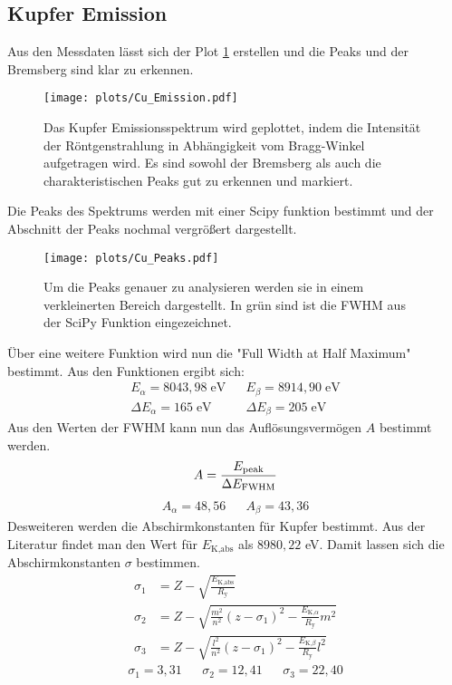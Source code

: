 \subsection{Kupfer Emission}
Aus den Messdaten lässt sich der Plot \ref{fig:Cu_Emission} erstellen und die Peaks und der Bremsberg sind klar zu erkennen.
\begin{figure}
    \centering
    \texttt{[image: plots/Cu\_Emission.pdf]}
    \caption{Das Kupfer Emissionsspektrum wird geplottet, indem die Intensität der Röntgenstrahlung in Abhängigkeit vom Bragg-Winkel aufgetragen wird.
    Es sind sowohl der Bremsberg als auch die charakteristischen Peaks gut zu erkennen und markiert.}
    \label{fig:Cu_Emission}
\end{figure}
Die Peaks des Spektrums werden mit einer Scipy funktion bestimmt und der Abschnitt der Peaks nochmal vergrößert dargestellt.
\begin{figure}
    \centering
    \texttt{[image: plots/Cu\_Peaks.pdf]}
    \caption{Um die Peaks genauer zu analysieren werden sie in einem verkleinerten Bereich dargestellt.
    In grün sind ist die FWHM aus der SciPy Funktion eingezeichnet.}
    \label{fig:Cu_Peaks}
\end{figure}
Über eine weitere Funktion wird nun die "Full Width at Half Maximum" bestimmt.
Aus den Funktionen ergibt sich:
\begin{align*}
    E_{\alpha} = 8043,98 \; \text{eV} && E_{\beta} = 8914,90 \; \text{eV}\\
    \Delta E_{\alpha} = 165 \;\text{eV} && \Delta E_{\beta} = 205 \;\text{eV}
\end{align*}
Aus den Werten der FWHM kann nun das Auflösungsvermögen $A$ bestimmt werden.
\begin{equation}
     A = \frac{E_{\text{peak}}}{\Delta E_{\text{FWHM}}} \nonumber\\
\end{equation}
\begin{align*}
    A_{\alpha}= 48,56 && A_{\beta} = 43,36
\end{align*}
Desweiteren werden die Abschirmkonstanten für Kupfer bestimmt.
Aus der Literatur findet man den Wert für $E_{\text{K,abs}}$ als $8980,22$ eV.
Damit lassen sich die Abschirmkonstanten $\sigma$ bestimmen.
\begin{align*}
    \sigma_1 &= Z-\sqrt{\frac{E_{\text{K,abs}}}{R_{\text{y}}}} \\
    \sigma_2 &= Z-\sqrt{ \frac{m^2}{n^2}\left(z-\sigma_1\right)^2- \frac{E_{\text{K,}\alpha}}{R_{\text{y}}}m^2 } \\
    \sigma_3 &= Z-\sqrt{ \frac{l^2}{n^2}\left(z-\sigma_1\right)^2- \frac{E_{\text{K,}\beta}}{R_{\text{y}}}l^2 }
\end{align*}
\begin{align*}
    \sigma_1 = 3,31 && \sigma_2 = 12,41 && \sigma_3 = 22,40 
\end{align*}


